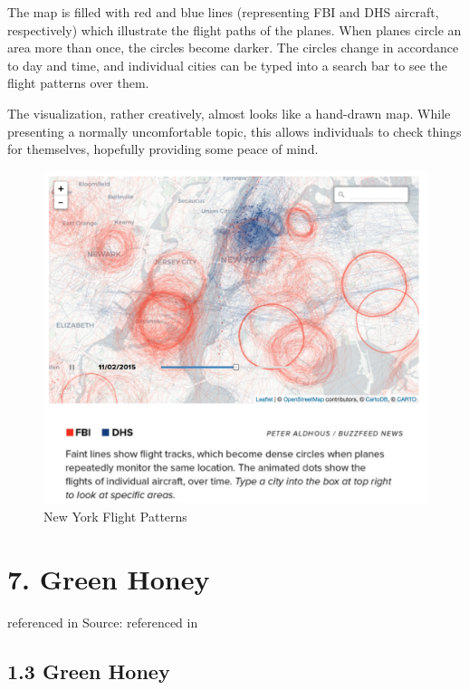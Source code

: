 \documentclass[]{book}
\theoremstyle{definition}
\theoremstyle{definition}
\theoremstyle{definition}
\theoremstyle{remark}
\begin{document}
The map is filled with red and blue lines (representing FBI and DHS
aircraft, respectively) which illustrate the flight paths of the planes.
When planes circle an area more than once, the circles become darker.
The circles change in accordance to day and time, and individual cities
can be typed into a search bar to see the flight patterns over them.

The visualization, rather creatively, almost looks like a hand-drawn
map. While presenting a normally uncomfortable topic, this allows
individuals to check things for themselves, hopefully providing some
peace of mind.

\begin{figure}
\centering
\includegraphics{images/NYCflights.png}
\caption{New York Flight Patterns}
\end{figure}

\section{7. Green Honey}\label{green-honey}

\citep{green_honey} referenced in \citep{cool_data} Source:
\citep{spies_sky} referenced in \citep{cool_data}

\subsection{1.3 Green Honey}\label{green-honey-1}
\end{document}
